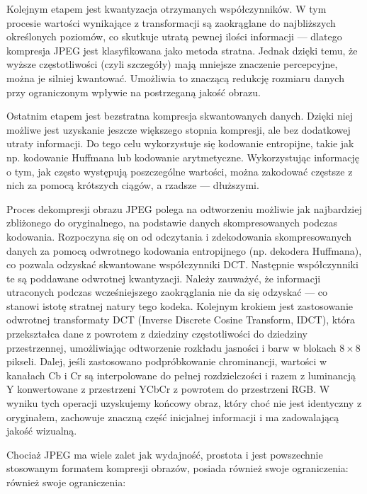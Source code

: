 Kolejnym etapem jest kwantyzacja otrzymanych współczynników. W tym procesie wartości wynikające z transformacji są zaokrąglane do najbliższych określonych poziomów, co skutkuje utratą pewnej ilości informacji --- dlatego kompresja JPEG jest klasyfikowana jako metoda stratna. Jednak dzięki temu, że wyższe częstotliwości (czyli szczegóły) mają mniejsze znaczenie percepcyjne, można je silniej kwantować. Umożliwia to znaczącą redukcję rozmiaru danych przy ograniczonym wpływie na postrzeganą jakość obrazu.

Ostatnim etapem jest bezstratna kompresja skwantowanych danych. Dzięki niej możliwe jest uzyskanie jeszcze większego stopnia kompresji, ale bez dodatkowej utraty informacji. Do tego celu wykorzystuje się kodowanie entropijne, takie jak np. kodowanie Huffmana lub kodowanie arytmetyczne. Wykorzystując informację o tym, jak często występują poszczególne wartości, można zakodować częstsze z nich za pomocą krótszych ciągów, a rzadsze --- dłuższymi.

Proces dekompresji obrazu JPEG polega na odtworzeniu możliwie jak najbardziej zbliżonego do oryginalnego, na podstawie danych skompresowanych podczas kodowania. Rozpoczyna się on od odczytania i zdekodowania skompresowanych danych za pomocą odwrotnego kodowania entropijnego (np. dekodera Huffmana), co pozwala odzyskać skwantowane współczynniki DCT. Następnie współczynniki te są poddawane odwrotnej kwantyzacji. Należy zauważyć, że informacji utraconych podczas wcześniejszego zaokrąglania nie da się odzyskać --- co stanowi istotę stratnej natury tego kodeka. Kolejnym krokiem jest zastosowanie odwrotnej transformaty DCT (Inverse Discrete Cosine Transform, IDCT), która przekształca dane z powrotem z dziedziny częstotliwości do dziedziny przestrzennej, umożliwiając odtworzenie rozkładu jasności i barw w blokach \(8 \times 8 \) pikseli. Dalej, jeśli zastosowano podpróbkowanie chrominancji, wartości w kanałach Cb i Cr są interpolowane do pełnej rozdzielczości i razem z luminancją Y konwertowane z przestrzeni YCbCr z powrotem do przestrzeni RGB. W wyniku tych operacji uzyskujemy końcowy obraz, który choć nie jest identyczny z oryginałem, zachowuje znaczną część inicjalnej informacji i ma zadowalającą jakość wizualną.

Chociaż JPEG ma wiele zalet jak wydajność, prostota i jest powszechnie stosowanym formatem kompresji obrazów, posiada również swoje ograniczenia:
również swoje ograniczenia:

